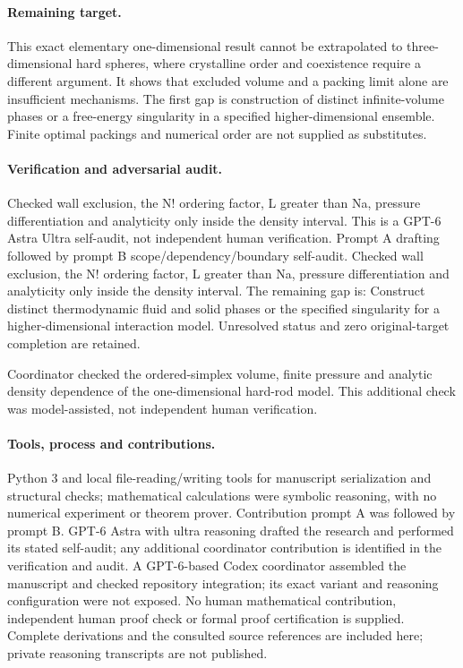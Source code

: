 \documentclass[11pt]{article}
\begin{document}
\paragraph{Remaining target.} This exact elementary one-dimensional result cannot be extrapolated to three-dimensional hard spheres, where crystalline order and coexistence require a different argument. It shows that excluded volume and a packing limit alone are insufficient mechanisms. The first gap is construction of distinct infinite-volume phases or a free-energy singularity in a specified higher-dimensional ensemble. Finite optimal packings and numerical order are not supplied as substitutes.

\paragraph{Verification and adversarial audit.}
Checked wall exclusion, the N! ordering factor, L greater than Na, pressure differentiation and analyticity only inside the density interval. This is a GPT-6 Astra Ultra self-audit, not independent human verification. Prompt A drafting followed by prompt B scope/dependency/boundary self-audit. Checked wall exclusion, the N! ordering factor, L greater than Na, pressure differentiation and analyticity only inside the density interval. The remaining gap is: Construct distinct thermodynamic fluid and solid phases or the specified singularity for a higher-dimensional interaction model. Unresolved status and zero original-target completion are retained.

Coordinator checked the ordered-simplex volume, finite pressure and analytic density dependence of the one-dimensional hard-rod model. This additional check was model-assisted, not independent human verification.

\paragraph{Tools, process and contributions.}
Python 3 and local file-reading/writing tools for manuscript serialization and structural checks; mathematical calculations were symbolic reasoning, with no numerical experiment or theorem prover. Contribution prompt A was followed by prompt B. GPT-6 Astra with ultra reasoning drafted the research and performed its stated self-audit; any additional coordinator contribution is identified in the verification and audit. A GPT-6-based Codex coordinator assembled the manuscript and checked repository integration; its exact variant and reasoning configuration were not exposed. No human mathematical contribution, independent human proof check or formal proof certification is supplied. Complete derivations and the consulted source references are included here; private reasoning transcripts are not published.
\end{document}
